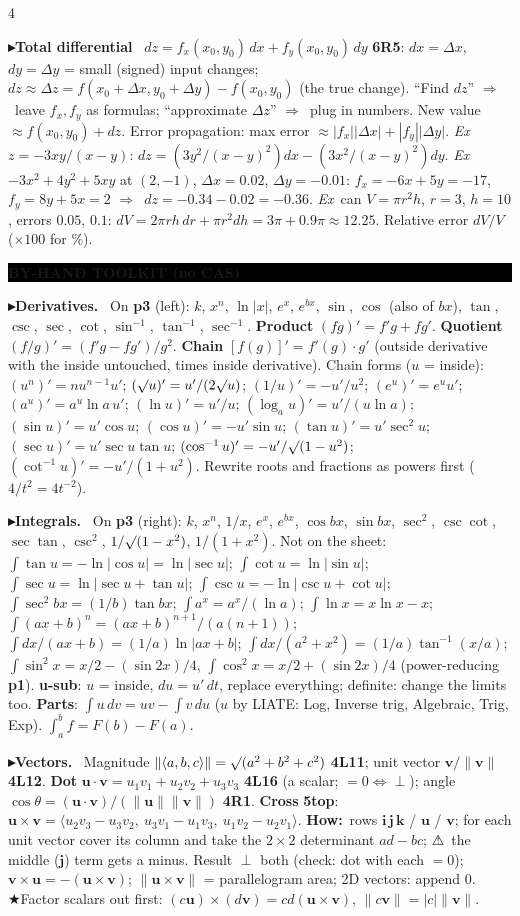 \documentclass{article}
\newcommand\vb[1]{\symbf{#1}}                 %
\newcommand\nm[1]{\lVert #1\rVert}            %
\newcommand\ip[1]{\langle #1\rangle}          %
\newcommand\sh[1]{{\setlength\fboxsep{0.18pt}\colorbox{black!22}{\textbf{#1}}}} %
\newcommand\hd[1]{\par\vspace{0.5pt}\needspace{4\baselineskip}\noindent
  {\setlength\fboxsep{0.45pt}\colorbox{black}{\parbox{\dimexpr\linewidth-2\fboxsep}{\color{white}\bfseries #1}}}\par\nobreak\vspace{0.2pt}\nobreak}
\newcommand\pt[1]{\par\textbf{{\symf ▸}#1}\ }  %
\newcommand\ex{\textit{Ex}\ }                  %
\newcommand\how{\textbf{How:}\ }
\newcommand\warn{{\symf ⚠}}                    %
\newcommand\shc{{\symf ★}}                      %
\newcommand\rt{\smash{\surd}}               %
\newcommand\then{\ensuremath{\Rightarrow}}
\begin{document}
\begin{multicols*}{4}
\pt{Total differential} $dz=f_x(x_0,y_0)\,dx+f_y(x_0,y_0)\,dy$ \sh{6R5}: $dx=\Delta x$, $dy=\Delta y$ = small (signed) input changes; $dz\approx\Delta z=f(x_0+\Delta x,y_0+\Delta y)-f(x_0,y_0)$ (the true change). ``Find $dz$'' \then\ leave $f_x,f_y$ as formulas; ``approximate $\Delta z$'' \then\ plug in numbers. New value $\approx f(x_0,y_0)+dz$. Error propagation: max error $\approx|f_x||\Delta x|+|f_y||\Delta y|$. \ex $z=-3xy/(x-y)$: $dz=(3y^2/(x-y)^2)dx-(3x^2/(x-y)^2)dy$. \ex $-3x^2+4y^2+5xy$ at $(2,-1)$, $\Delta x=0.02$, $\Delta y=-0.01$: $f_x=-6x+5y=-17$, $f_y=8y+5x=2$ \then\ $dz=-0.34-0.02=-0.36$. \ex can $V=\pi r^2h$, $r=3$, $h=10$, errors $0.05$, $0.1$: $dV=2\pi rh\,dr+\pi r^2dh=3\pi+0.9\pi\approx12.25$. Relative error $dV/V$ ($\times100$ for \%).

\hd{BY-HAND TOOLKIT (no CAS)}
\pt{Derivatives.} On \sh{p3} (left): $k$, $x^n$, $\ln|x|$, $e^x$, $e^{bx}$, $\sin$, $\cos$ (also of $bx$), $\tan$, $\csc$, $\sec$, $\cot$, $\sin^{-1}$, $\tan^{-1}$, $\sec^{-1}$. \textbf{Product} $(fg)'=f'g+fg'$. \textbf{Quotient} $(f/g)'=(f'g-fg')/g^2$. \textbf{Chain} $[f(g)]'=f'(g)\cdot g'$ (outside derivative with the inside untouched, times inside derivative). Chain forms ($u$ = inside): $(u^n)'=nu^{n-1}u'$; $(\rt u)'=u'/(2\rt u)$; $(1/u)'=-u'/u^2$; $(e^u)'=e^uu'$; $(a^u)'=a^u\ln a\,u'$; $(\ln u)'=u'/u$; $(\log_au)'=u'/(u\ln a)$; $(\sin u)'=u'\cos u$; $(\cos u)'=-u'\sin u$; $(\tan u)'=u'\sec^2u$; $(\sec u)'=u'\sec u\tan u$; $(\cos^{-1}u)'=-u'/\rt(1-u^2)$; $(\cot^{-1}u)'=-u'/(1+u^2)$. Rewrite roots and fractions as powers first ($4/t^2=4t^{-2}$).

\pt{Integrals.} On \sh{p3} (right): $k$, $x^n$, $1/x$, $e^x$, $e^{bx}$, $\cos bx$, $\sin bx$, $\sec^2$, $\csc\cot$, $\sec\tan$, $\csc^2$, $1/\rt(1-x^2)$, $1/(1+x^2)$. Not on the sheet: $\int\tan u=-\ln|\cos u|=\ln|\sec u|$; $\int\cot u=\ln|\sin u|$; $\int\sec u=\ln|\sec u+\tan u|$; $\int\csc u=-\ln|\csc u+\cot u|$; $\int\sec^2bx=(1/b)\tan bx$; $\int a^x=a^x/(\ln a)$; $\int\ln x=x\ln x-x$; $\int(ax+b)^n=(ax+b)^{n+1}/(a(n+1))$; $\int dx/(ax+b)=(1/a)\ln|ax+b|$; $\int dx/(a^2+x^2)=(1/a)\tan^{-1}(x/a)$; $\int\sin^2x=x/2-(\sin2x)/4$, $\int\cos^2x=x/2+(\sin2x)/4$ (power-reducing \sh{p1}). \textbf{u-sub}: $u$ = inside, $du=u'\,dt$, replace everything; definite: change the limits too. \textbf{Parts}: $\int u\,dv=uv-\int v\,du$ ($u$ by LIATE: Log, Inverse trig, Algebraic, Trig, Exp). $\int_a^bf=F(b)-F(a)$.

\pt{Vectors.} Magnitude $\nm{\ip{a,b,c}}=\rt(a^2+b^2+c^2)$ \sh{4L11}; unit vector $\vb v/\nm{\vb v}$ \sh{4L12}. \textbf{Dot} $\vb u\cdot\vb v=u_1v_1+u_2v_2+u_3v_3$ \sh{4L16} (a scalar; $=0\iff\perp$); angle $\cos\theta=(\vb u\cdot\vb v)/(\nm{\vb u}\nm{\vb v})$ \sh{4R1}. \textbf{Cross} \sh{5top}: $\vb u\times\vb v=\ip{u_2v_3-u_3v_2,\ u_3v_1-u_1v_3,\ u_1v_2-u_2v_1}$. \how rows $\vb i\,\vb j\,\vb k$ / $\vb u$ / $\vb v$; for each unit vector cover its column and take the $2\times2$ determinant $ad-bc$; \warn\ the middle ($\vb j$) term gets a minus. Result $\perp$ both (check: dot with each $=0$); $\vb v\times\vb u=-(\vb u\times\vb v)$; $\nm{\vb u\times\vb v}$ = parallelogram area; 2D vectors: append 0. \shc Factor scalars out first: $(c\vb u)\times(d\vb v)=cd(\vb u\times\vb v)$, $\nm{c\vb v}=|c|\nm{\vb v}$.


\end{multicols*}
\end{document}
